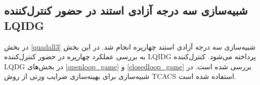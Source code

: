 \subsection{شبیه‌سازی سه درجه آزادی استند در حضور کنترل‌کننده LQIDG}\label{roll_pitch_yaw_lqidg_section}
در بخش
\ref{quadall3}
شبیه‌سازی سه درجه آزادی استند چهارپره انجام شد. در این بخش به بررسی عملکرد چهارپره در حضور کنترل‌کننده LQIDG پرداخته می‌شود. کنترل‌کننده LQDG در بخش‌های
\ref{openloop_game}
و
\ref{closedloop_game}
بررسی شده است.
 در شبیه‌سازی برای بهینه‌سازی ضرایب وزنی از روش
TCACS \cite{Karimi2010}
استفاده شده است.

%
